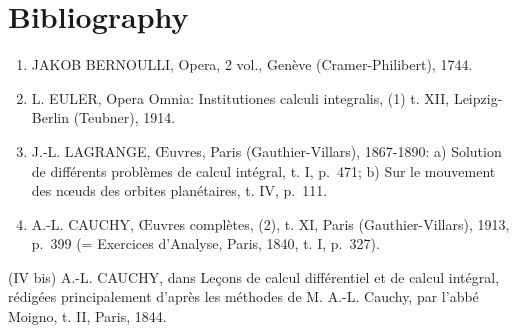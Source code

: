 \section*{Bibliography}
{}

\begin{enumerate}
\def\labelenumi{(\Roman{enumi})}
\item
  JAKOB BERNOULLI, Opera, 2 vol., Genève (Cramer-Philibert), 1744.
\item
  L. EULER, Opera Omnia: Institutiones calculi integralis, (1) t. XII, Leipzig-Berlin (Teubner), 1914.
\item
  J.-L. LAGRANGE, Œuvres, Paris (Gauthier-Villars), 1867-1890: a) Solution de différents problèmes de calcul intégral, t. I, p.~471; b) Sur le mouvement des nœuds des orbites planétaires, t. IV, p.~111.
\item
  A.-L. CAUCHY, Œuvres complètes, (2), t. XI, Paris (Gauthier-Villars), 1913, p.~399 (= Exercices d'Analyse, Paris, 1840, t. I, p.~327).
\end{enumerate}

(IV bis) A.-L. CAUCHY, dans Leçons de calcul différentiel et de calcul intégral, rédigées principalement d'après les méthodes de M. A.-L. Cauchy, par l'abbé Moigno, t. II, Paris, 1844.

